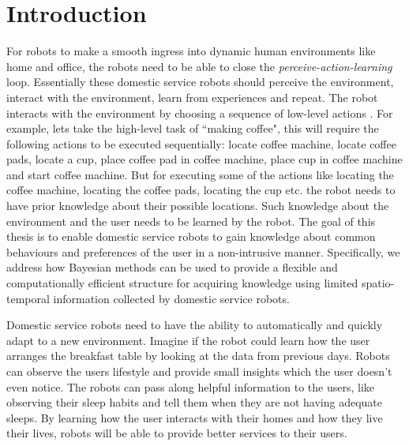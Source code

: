 \chapter{Introduction}
\label{chapter:Introduction}

For robots to make a smooth ingress into dynamic human environments like home and office, the robots need to be able to close the \emph{perceive-action-learning} loop. Essentially these domestic service robots should perceive the environment, interact with the environment, learn from experiences and repeat. The robot interacts with the environment by choosing a sequence of low-level actions . For example, lets take the high-level task of ``making coffee", this will require the following actions to be executed sequentially: locate coffee machine, locate coffee pads, locate a cup, place coffee pad in coffee machine, place cup in coffee machine and start coffee machine. But for executing some of the actions like locating the coffee machine, locating the coffee pads, locating the cup etc. the robot needs to have prior knowledge about their possible locations. Such knowledge about the environment and the user needs to be learned by the robot. The goal of this thesis is to enable domestic service robots to gain knowledge about common behaviours and preferences of the user in a non-intrusive manner. Specifically, we address how Bayesian methods can be used to provide a flexible and computationally efficient structure for acquiring knowledge using limited spatio-temporal information collected by domestic service robots.

Domestic service robots need to have the ability to automatically and quickly adapt to a new environment. Imagine if the robot could learn how the user arranges the breakfast table by looking at the data from previous days. Robots can observe the users lifestyle and provide small insights which the user doesn't even notice. The robots can pass along helpful information to the users, like observing their sleep habits and tell them when they are not having adequate sleeps. By learning how the user interacts with their homes and how they live their lives, robots will be able to provide better services to their users. 


